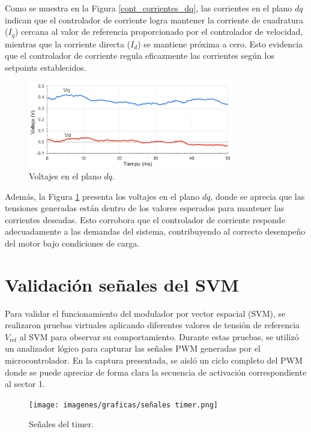 \documentclass[11pt]{report}
\begin{document}
Como se muestra en la Figura \ref{cont_corrientes_dq}, las corrientes en el plano $dq$ indican que el controlador de corriente logra mantener la corriente de cuadratura ($I_q$) cercana al valor de referencia proporcionado por el controlador de velocidad, mientras que la corriente directa ($I_d$) se mantiene próxima a cero. Esto evidencia que el controlador de corriente regula eficazmente las corrientes según los setpoints establecidos.

\begin{figure}[ht]
	\centering
	\includegraphics[width=0.8\textwidth]{imagenes/graficas/CC_DQ.png}
	\caption{Voltajes en el plano $dq$.}
	\label{voltajes_dq}
\end{figure}
\FloatBarrier

Además, la Figura \ref{voltajes_dq} presenta los voltajes en el plano $dq$, donde se aprecia que las tensiones generadas están dentro de los valores esperados para mantener las corrientes deseadas. Esto corrobora que el controlador de corriente responde adecuadamente a las demandas del sistema, contribuyendo al correcto desempeño del motor bajo condiciones de carga.

\newpage
\section{Validación señales del SVM}

Para validar el funcionamiento del modulador por vector espacial (SVM), se realizaron pruebas virtuales aplicando diferentes valores de tensión de referencia $V_{\text{ref}}$ al SVM para observar su comportamiento. Durante estas pruebas, se utilizó un analizador lógico para capturar las señales PWM generadas por el microcontrolador. En la captura presentada, se aisló un ciclo completo del PWM donde se puede apreciar de forma clara la secuencia de activación correspondiente al sector 1.

\begin{figure}[ht]
	\centering
	\texttt{[image: imagenes/graficas/señales timer.png]}
	\caption{Señales del timer.}
	\label{señal_timer}
\end{figure}
\FloatBarrier
\end{document}
